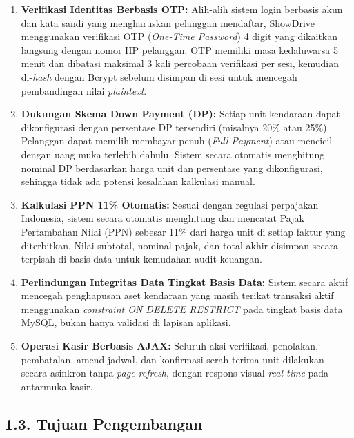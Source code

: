 \documentclass[11pt, a5paper]{article}
\begin{document}
\begin{enumerate}[label=\alph*.]
  \item \textbf{Verifikasi Identitas Berbasis OTP:} Alih-alih sistem login
        berbasis akun dan kata sandi yang mengharuskan pelanggan mendaftar,
        ShowDrive menggunakan verifikasi OTP (\textit{One-Time Password}) 4 digit
        yang dikaitkan langsung dengan nomor HP pelanggan. OTP memiliki masa
        kedaluwarsa 5 menit dan dibatasi maksimal 3 kali percobaan verifikasi per
        sesi, kemudian di-\textit{hash} dengan Bcrypt sebelum disimpan di sesi
        untuk mencegah pembandingan nilai \textit{plaintext}.

  \item \textbf{Dukungan Skema Down Payment (DP):} Setiap unit kendaraan dapat
        dikonfigurasi dengan persentase DP tersendiri (misalnya 20\% atau 25\%).
        Pelanggan dapat memilih membayar penuh (\textit{Full Payment}) atau
        mencicil dengan uang muka terlebih dahulu. Sistem secara otomatis
        menghitung nominal DP berdasarkan harga unit dan persentase yang
        dikonfigurasi, sehingga tidak ada potensi kesalahan kalkulasi manual.

  \item \textbf{Kalkulasi PPN 11\% Otomatis:} Sesuai dengan regulasi perpajakan
        Indonesia, sistem secara otomatis menghitung dan mencatat Pajak
        Pertambahan Nilai (PPN) sebesar 11\% dari harga unit di setiap faktur
        yang diterbitkan. Nilai subtotal, nominal pajak, dan total akhir
        disimpan secara terpisah di basis data untuk kemudahan audit keuangan.

  \item \textbf{Perlindungan Integritas Data Tingkat Basis Data:} Sistem secara
        aktif mencegah penghapusan aset kendaraan yang masih terikat transaksi
        aktif menggunakan \textit{constraint ON DELETE RESTRICT} pada tingkat
        basis data MySQL, bukan hanya validasi di lapisan aplikasi.

  \item \textbf{Operasi Kasir Berbasis AJAX:} Seluruh aksi verifikasi, penolakan,
        pembatalan, amend jadwal, dan konfirmasi serah terima unit dilakukan
        secara asinkron tanpa \textit{page refresh}, dengan respons visual
        \textit{real-time} pada antarmuka kasir.
\end{enumerate}

\subsection*{1.3. Tujuan Pengembangan}
\end{document}
